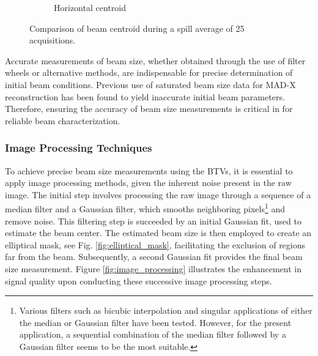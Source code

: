 \begin{figure}[htbp]
\begin{subfigure}[b]{0.49\textwidth}
        \caption{Horizontal centroid}
        \label{fig:centroidV}
    \end{subfigure}
    \caption{Comparison of beam centroid during a spill average of 25 acquisitions.}
    \label{fig:filter_centroid}
\end{figure}

Accurate measurements of beam size, whether obtained through the use of filter wheels or alternative methods, are indispensable for precise determination of initial beam conditions. Previous use of saturated beam size data for MAD-X reconstruction has been found to yield inaccurate initial beam parameters. Therefore, ensuring the accuracy of beam size measurements is critical in for reliable beam characterization.
\\

\subsubsection{Image Processing Techniques}

To achieve precise beam size measurements using the BTVs, it is essential to apply image processing methods, given the inherent noise present in the raw image. The initial step involves processing the raw image through a sequence of a median filter and a Gaussian filter, which smooths neighboring pixels\footnote{Various filters such as bicubic interpolation and singular applications of either the median or Gaussian filter have been tested. However, for the present application, a sequential combination of the median filter followed by a Gaussian filter seems to be the most suitable.} and remove noise. This filtering step is succeeded by an initial Gaussian fit, used to estimate the beam center. The estimated beam size is then employed to create an elliptical mask, see Fig. \ref{fig:elliptical_mask}, facilitating the exclusion of regions far from the beam. Subsequently, a second Gaussian fit provides the final beam size measurement. Figure \ref{fig:image_processing} illustrates the enhancement in signal quality upon conducting these successive image processing steps.

